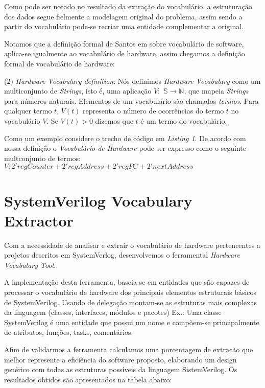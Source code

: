 \documentclass[12pt, twocolumn, a4paper]{article}
\begin{document}
Como pode ser notado no resultado da extração do vocabulário, a estruturação dos dados segue fielmente a modelagem original do problema, assim sendo a partir do vocabulário pode-se recriar uma entidade complementar a original.

Notamos que a definição formal de Santos em \cite{Santos2015} sobre vocabulário de software, aplica-se igualmente ao vocabulário de hardware, assim chegamos a definição formal de vocabulário de hardware:

(2) \textit{Hardware Vocabulary definition}: Nós definimos \textit{Hardware Vocabulary} como um multiconjunto de \textit{Strings}, isto é, uma aplicação $V:$ $\mathbb{S}\rightarrow\mathbb{N}$, que mapeia \textit{Strings} para números naturais. Elementos de um vocabulário são chamados \textit{termos}. Para qualquer termo $t$, $V(t)$ representa o número de ocorrências do termo $t$ no vocabulário $V$. Se $V(t)>0$ dizemos que $t$ é um termo do vocabulário.

Como um exemplo considere o trecho de código em \textit{Listing 1}. De acordo com nossa definição o \textit{Vocabulário de Hardware} pode ser expresso como o seguinte multconjunto de termos:\\

$V: 2'regCounter + 2'regAddress + 2'regPC + 2'nextAddress$


	\section{SystemVerilog Vocabulary Extractor}

\quad Com a necessidade de analisar e extrair o vocabulário de hardware pertencentes a projetos descritos em SystemVerlog, desenvolvemos o ferramental \textit{Hardware Vocabulary Tool}.

A implementação desta ferramenta, baseia-se em entidades que são capazes de processar o vocabulário de hardware dos principais elementos estruturais básicos de SystemVerilog. Usando de delegação montam-se as estruturas mais complexas da linguagem (classes, interfaces, módulos e pacotes) Ex.: Uma classe SystemVerilog é uma entidade que possui um nome e compõem-se principalmente de atributos, funções, tasks, comentários.
	
Afim de validarmos a ferramenta calculamos uma porcentagem de extracão que melhor represente a eficiência do software proposto, elaborando um design genérico com todas as estruturas possíveis da linguagem SistemVerilog. Os resultados obtidos são apresentados na tabela abaixo:
\end{document}
